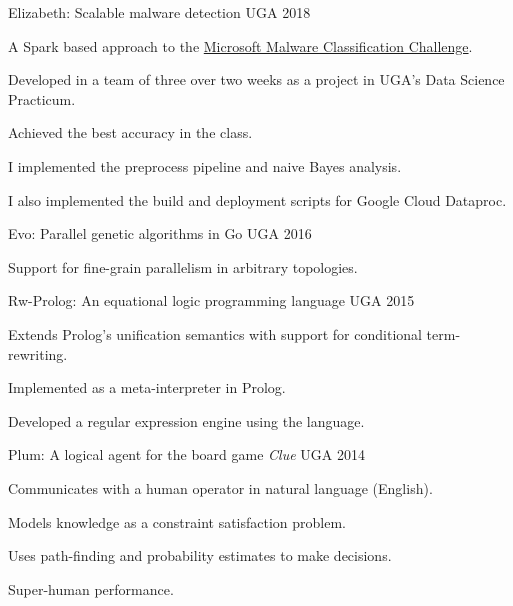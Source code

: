 \begin{cventries}

\cventry
{\textnormal{}}
{Elizabeth: Scalable malware detection}
{UGA}
{2018}
{\begin{cvitems}
    \item {A Spark based approach to the \href{https://www.kaggle.com/c/malware-classification/}{Microsoft Malware Classification Challenge}.}
    \item {Developed in a team of three over two weeks as a project in UGA's Data Science Practicum.}
    \item {Achieved the best accuracy in the class.}
    \item {I implemented the preprocess pipeline and naive Bayes analysis.}
    \item {I also implemented the build and deployment scripts for Google Cloud Dataproc.}
\end{cvitems}}

\cventry
{\textnormal{}}
{Evo: Parallel genetic algorithms in Go}
{UGA}
{2016}
{\begin{cvitems}
    \item {Support for fine-grain parallelism in arbitrary topologies.}
\end{cvitems}}

\cventry
{\textnormal{}}
{Rw-Prolog: An equational logic programming language}
{UGA}
{2015}
{\begin{cvitems}
    \item {Extends Prolog's unification semantics with support for conditional term-rewriting.}
    \item {Implemented as a meta-interpreter in Prolog.}
    \item {Developed a regular expression engine using the language.}
\end{cvitems}}

\cventry
{\textnormal{}}
{Plum: A logical agent for the board game \textit{Clue}}
{UGA}
{2014}
{\begin{cvitems}
    \item {Communicates with a human operator in natural language (English).}
    \item {Models knowledge as a constraint satisfaction problem.}
    \item {Uses path-finding and probability estimates to make decisions.}
    \item {Super-human performance.}
\end{cvitems}}

\end{cventries}
